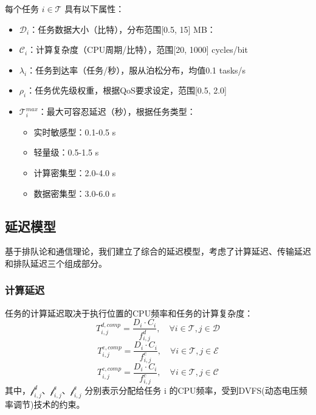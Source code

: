 \documentclass[conference]{IEEEtran}
\begin{document}
每个任务 $i \in \mathcal{T}$ 具有以下属性：
\begin{itemize}
    \item $\mathcal{D}_{i}$：任务数据大小（比特），分布范围[0.5, 15] MB：
    \item $\mathcal{C}_{i}$：计算复杂度（CPU周期/比特），范围[20, 1000] cycles/bit
     \item $\mathcal{\lambda}_{i}$：任务到达率（任务/秒），服从泊松分布，均值0.1 tasks/s
    \item $\mathcal{\rho}_{i}$：任务优先级权重，根据QoS要求设定，范围[0.5, 2.0]
    \item $\mathcal{T}_{i}^{max}$：最大可容忍延迟（秒），根据任务类型：
    \begin{itemize}
        \item 实时敏感型：0.1-0.5 s
        \item 轻量级：0.5-1.5 s
        \item 计算密集型：2.0-4.0 s
        \item 数据密集型：3.0-6.0 s
    \end{itemize}
\end{itemize}
\subsection{延迟模型}
基于排队论和通信理论，我们建立了综合的延迟模型，考虑了计算延迟、传输延迟和排队延迟三个组成部分。
\subsubsection{计算延迟}
任务的计算延迟取决于执行位置的CPU频率和任务的计算复杂度：
\begin{equation}
T_{i,j}^{d,comp} = \frac{D_i \cdot C_i}{f_{i,j}^d}, \quad \forall i \in \mathcal{T}, j \in \mathcal{D}
\end{equation}
\begin{equation}
T_{i,j}^{e,comp} = \frac{D_i \cdot C_i}{f_{i,j}^e}, \quad \forall i \in \mathcal{T}, j \in \mathcal{E}
\end{equation}
\begin{equation}
T_{i,j}^{c,comp} = \frac{D_i \cdot C_i}{f_{i,j}^c}, \quad \forall i \in \mathcal{T}, j \in \mathcal{C}
\end{equation}
其中，$\mathcal{f}_{i,j}^{d}$、$\mathcal{f}_{i,j}^{e}$、$\mathcal{f}_{i,j}^{c}$ 分别表示分配给任务 i 的CPU频率，受到DVFS(动态电压频率调节)技术的约束。
\end{document}
